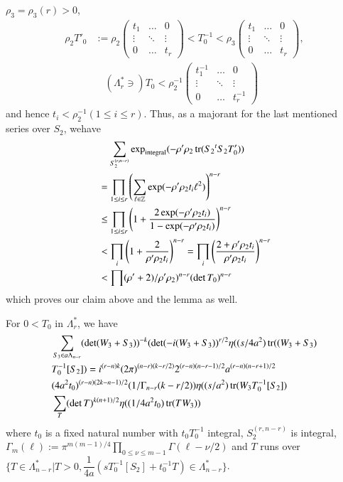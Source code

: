 $\rho_{3}=\rho_{3}(r)>0$, 
\begin{align*}
\rho_{2}T'_{0} &:= \rho_{2}
\begin{pmatrix}
t_{1} & \ldots & 0\\
\vdots & \ddots & \vdots\\
0 & \ldots & t_{r}
\end{pmatrix}
<T^{-1}_{0}<\rho_{3}
\begin{pmatrix}
t_{1} & \ldots & 0\\
\vdots & \ddots & \vdots\\
0 & \ldots & t_{r}
\end{pmatrix},\\
&\quad(\Lambda^{\ast}_{r}\ni)T_{0}<\rho^{-1}_{2}
\begin{pmatrix}
t^{-1}_{1} & \ldots & 0\\
\vdots & \ddots & \vdots\\
0 & \ldots & t^{-1}_{r}
\end{pmatrix}
\end{align*}
and hence $t_{i}<\rho^{-1}_{2}(1\leq i\leq r)$. Thus, as a majorant
for the last mentioned series over $S_{2}$, we\pageoriginale have
\begin{align*}
&\quad
  \sum_{S_{2}^{(r,n-r)}}\exp\limits_{\text{integral}}(-\rho'\rho_{2}\operatorname{tr}(S_{2}{}^{t}S_{2}T'_{0}))\\
&= \prod_{1\leq i\leq
    r}\left(\sum_{\ell\in\mathbb{Z}}\exp(-\rho'\rho_{2}t_{i}\ell^{2})\right)^{n-r}\\
&\leq \prod_{1\leq i\leq
    r}\left(1+\frac{2\exp(-\rho'\rho_{2}t_{i})}{1-\exp(-\rho'\rho_{2}t_{i})}\right)^{n-r}\\
&<
  \prod_{i}\left(1+\frac{2}{\rho'\rho_{2}t_{i}}\right)^{n-r}=\prod_{i}\left(\frac{2+\rho'\rho_{2}t_{i}}{\rho'\rho_{2}t_{i}}\right)^{n-r}\\
&< \prod(\rho'+2)/\rho'\rho_{2})^{n-r}(\det T_{0})^{n-r}
\end{align*}
which proves our claim above and the lemma as well.

\begin{sublemma}\label{c1:lem-1.6.19}
For $0<T_{0}$ in $\Lambda^{\ast}_{r}$, we have
\begin{align*}
&\sum_{S_{3}\in a\Lambda_{n-r}}(\det (W_{3}+S_{3}))^{-k}(\det
(-i(W_{3}+S_{3}))^{r/2}\eta((s/4a^{2})\operatorname{tr}((W_{3}+S_{3})\\
&T^{-1}_{0}[S_{2}])=i^{(r-n)k}(2\pi)^{(n-r)(k-r/2)}2^{(r-n)(n-r-1)/2}a^{(r-n)(n-r+1)/2}\\
&(4a^{2}t_{0})^{(r-n)(2k-n-1)/2}(1/\Gamma_{n-r}(k-r/2))\eta((s/a^{2})\operatorname{tr}(W_{3}T^{-1}_{0}[S_{2}])\\
&\sum_{T}(\det T)^{k(n+1)/2}\eta((1/4a^{2}t_{0})\operatorname{tr}(TW_{3})) 
\end{align*}
where $t_{0}$ is a fixed natural number with $t_{0}T^{-1}_{0}$
integral, $S_{2}^{(r,n-r)}$ is integral,
$\Gamma_{m}(\ell):=\pi^{m(m-1)/4}\prod\limits_{0\leq \nu\leq
  m-1}\Gamma(\ell-\nu/2)$ and $T$ runs over
$\{T\in\Lambda^{\ast}_{n-r}|T>0,\dfrac{1}{4a}(sT^{-1}_{0}[S_{2}]+t^{-1}_{0}T)\in\Lambda^{\ast}_{n-r}\}$. 
\end{sublemma}

